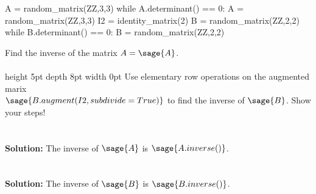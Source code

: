 \documentclass{ximera}
\def\mystrut(#1,#2){\vrule height #1pt depth #2pt width 0pt}
\begin{document}
\begin{sagesilent}
A = random_matrix(ZZ,3,3)
while A.determinant() == 0:
    A = random_matrix(ZZ,3,3)
I2 = identity_matrix(2)
B = random_matrix(ZZ,2,2)
while B.determinant() == 0:
    B = random_matrix(ZZ,2,2)
\end{sagesilent}
\noindent Find the inverse of the matrix $A=\sage{A}$.\\\\
\noindent \mystrut(5,8) Use elementary row operations on the augmented
marix\\$\sage{B.augment(I2,subdivide=True)}$ to find the inverse of $\sage{B}$.
Show your steps!\\\\\\
{\bf Solution:} The inverse of   $\sage{A}$ is  $\sage{A.inverse()}$.\\\\\\
{\bf Solution:} The inverse of   $\sage{B}$ is  $\sage{B.inverse()}$.
\end{document}
